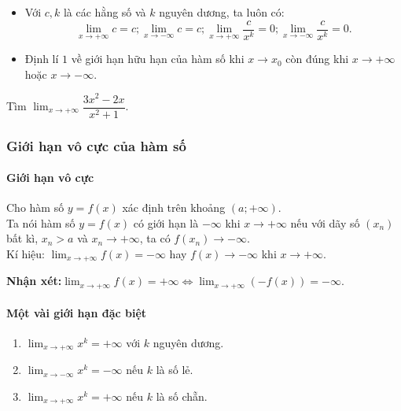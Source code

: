 \begin{note}
\begin{itemize}
\item	Với $c,k$ là các hằng số và $k$ nguyên dương, ta luôn có: 
$$ \displaystyle \lim_{x \to + \infty}c = c; \displaystyle \lim_{x \to - \infty} c = c; \displaystyle \lim_{x \to + \infty} \dfrac{c}{x^k}= 0;\displaystyle \lim_{x \to - \infty} \dfrac{c}{x^k}= 0.$$
\item	Định lí $1$ về giới hạn hữu hạn của hàm số khi $x \rightarrow x_0$ còn đúng khi $x \rightarrow +\infty$ hoặc $x \rightarrow -\infty$.
\end{itemize}
\end{note}
\begin{vd}%
Tìm $\displaystyle \lim_{x \to +\infty} \dfrac{3x^2 - 2x}{x^2 + 1}$.
\end{vd}
\subsubsection{Giới hạn vô cực của hàm số}
\paragraph{Giới hạn vô cực}
\begin{dn}
Cho hàm số $y = f(x)$ xác định trên khoảng $\left(a; +\infty \right)$. \\
Ta nói hàm số $y = f(x)$ có giới hạn là $- \infty$ khi $x \rightarrow + \infty$ nếu với dãy số $\left(x_n \right)$ bất kì, $x_n > a$ và $x_n \rightarrow +\infty$, ta có $f\left(x_n \right) \rightarrow - \infty$.\\
Kí hiệu: $\displaystyle \lim_{x \to + \infty}f(x) = - \infty$ hay $f(x) \rightarrow - \infty$ khi $x \rightarrow + \infty$.
\end{dn}
\textbf{Nhận xét:}$\displaystyle \lim_{x \to + \infty}f(x) = + \infty \Leftrightarrow \displaystyle \lim_{x \to + \infty} (-f(x)) = - \infty$.
\paragraph{Một vài giới hạn đặc biệt}
\begin{enumerate}
\item	$\displaystyle \lim_{x \to +\infty} x^k = + \infty$ với $k$ nguyên dương.
\item	$\displaystyle \lim_{x \to -\infty} x^k = - \infty$ nếu $k$ là số lẻ.
\item 	$\displaystyle \lim_{x \to +\infty} x^k = + \infty$ nếu $k$ là số chẵn.
\end{enumerate}

